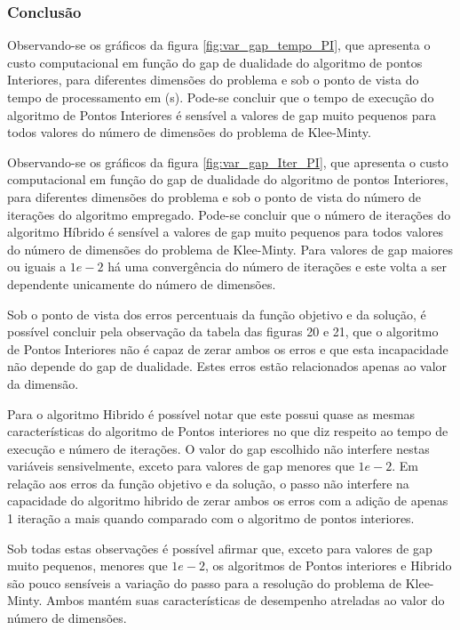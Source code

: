 \documentclass[11pt,a4paper]{article}
\begin{document}
        
        
        \subsubsection{Conclusão}

            Observando-se os gráficos da figura \ref{fig:var_gap_tempo_PI}, que apresenta o custo computacional em função do gap de dualidade do algoritmo de pontos Interiores, para diferentes dimensões do problema e sob o ponto de vista do tempo de processamento em (s). Pode-se concluir que o tempo de execução do algoritmo de Pontos Interiores é sensível a valores de gap muito pequenos para todos valores do número de dimensões do problema de Klee-Minty. 
            
            Observando-se os gráficos da figura \ref{fig:var_gap_Iter_PI}, que apresenta o custo computacional em função do gap de dualidade do algoritmo de pontos Interiores, para diferentes dimensões do problema e sob o ponto de vista do número de iterações do algoritmo empregado. Pode-se concluir que o número de iterações do algoritmo Híbrido é sensível a valores de gap muito pequenos para todos valores do número de dimensões do problema de Klee-Minty. Para valores de gap maiores ou iguais a $1e-2$ há uma convergência do número de iterações e este volta a ser dependente unicamente do número de dimensões.
 
            Sob o ponto de vista dos erros percentuais da função objetivo e da solução, é possível concluir pela observação da tabela das figuras 20 e 21, que o algoritmo de Pontos Interiores não é capaz de zerar ambos os erros e que esta incapacidade não depende do gap de dualidade. Estes erros estão relacionados apenas ao valor da dimensão.  

            Para o algoritmo Hibrido é possível notar que este possui quase as mesmas características do algoritmo de Pontos interiores no que diz respeito ao tempo de execução e número de iterações. O valor do gap escolhido não interfere nestas variáveis sensivelmente, exceto para valores de gap menores que $1e-2$.  Em relação aos erros da função objetivo e da solução, o passo não interfere na capacidade do algoritmo hibrido de zerar ambos os erros com a adição de apenas 1 iteração a mais quando comparado com o algoritmo de pontos interiores.

            Sob todas estas observações é possível afirmar que, exceto para valores de gap muito pequenos, menores que $1e-2$, os algoritmos de Pontos interiores e Hibrido são pouco sensíveis a variação do passo para a resolução do problema de Klee-Minty. Ambos mantém suas características de desempenho atreladas ao valor do número de dimensões.
\end{document}
